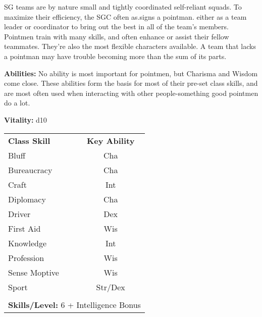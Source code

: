 \begin{multicols}{2}

SG teams are by nature small and tightly coordinated self-reliant squads. To maximize their efficiency, the SGC often as.signs a pointman. either as a team leader or coordinator to bring out the best in all of the team's members. Pointmen train with many skills, and often enhance or assist their fellow teammates. They're also the most flexible characters available. A team that lacks a pointman may have trouble becoming more than the sum of its parts.

\columnbreak

\textbf{Abilities:} No ability is most important for pointmen, but Charisma and Wisdom come close. These abilities form the basis for most of their pre-set class skills, and are most often used when interacting with other people-something good pointmen do a lot.

\textbf{Vitality:} d10

\end{multicols}

\begin{table}[htb]
\raggedright
\begin{tabular}{l c}
\textbf{Class Skill} & \textbf{Key Ability}\\

Bluff & Cha\\
Bureaucracy & Cha\\
Craft & Int\\
Diplomacy & Cha\\
Driver & Dex\\
First Aid & Wis\\
Knowledge & Int\\
Profession & Wis\\
Sense Moptive & Wis\\
Sport & Str/Dex\\

\multicolumn{2}{l}{\cellcolor{white}}\\
\multicolumn{2}{l}{\cellcolor{white}\textbf{Skills/Level:} 6 + Intelligence Bonus}\\
\end{tabular}
\end{table}

\pagebreak

\modebab{}
\modefor{}
\moderef{}
\goodwil{}
\poordefb{}
\poorinit{}
\goodgear{}
\moderes{}

